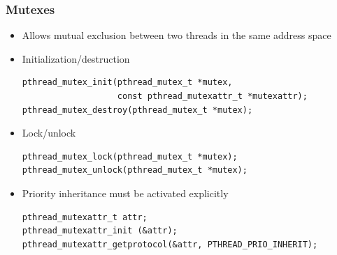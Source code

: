 \begin{frame}[fragile]
  \frametitle{Mutexes}
  \begin{itemize}
  \item Allows mutual exclusion between two threads in the same
    address space
  \item Initialization/destruction
    \begin{block}{}
\footnotesize
\begin{verbatim}
pthread_mutex_init(pthread_mutex_t *mutex,
                   const pthread_mutexattr_t *mutexattr);
pthread_mutex_destroy(pthread_mutex_t *mutex);
\end{verbatim}
\normalsize
    \end{block}
  \item Lock/unlock
    \begin{block}{}
\footnotesize
\begin{verbatim}
pthread_mutex_lock(pthread_mutex_t *mutex);
pthread_mutex_unlock(pthread_mutex_t *mutex);
\end{verbatim}
\normalsize
    \end{block}
  \item Priority inheritance must be activated explicitly
    \begin{block}{}
\footnotesize
\begin{verbatim}
pthread_mutexattr_t attr;
pthread_mutexattr_init (&attr);
pthread_mutexattr_getprotocol(&attr, PTHREAD_PRIO_INHERIT);
\end{verbatim}
\normalsize
    \end{block}
  \end{itemize}
\end{frame}

